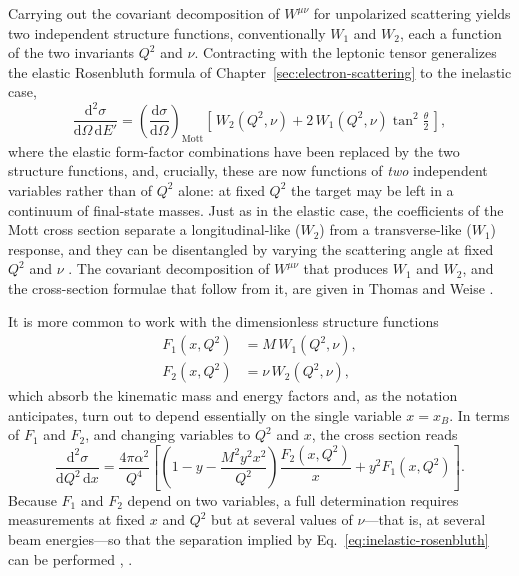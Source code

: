 Carrying out the covariant decomposition of $W^{\mu\nu}$ for unpolarized scattering
yields two independent structure functions, conventionally $W_{1}$ and $W_{2}$, each a
function of the two invariants $Q^{2}$ and $\nu$. Contracting with the leptonic tensor
generalizes the elastic Rosenbluth formula of Chapter~\ref{sec:electron-scattering} to
the inelastic case,
\begin{equation}
    \frac{\mathrm{d}^{2}\sigma}{\mathrm{d}\Omega\,\mathrm{d}E'}
    = \left(\frac{\mathrm{d}\sigma}{\mathrm{d}\Omega}\right)_{\!\mathrm{Mott}}
      \left[\,W_{2}(Q^{2},\nu) + 2\,W_{1}(Q^{2},\nu)\tan^{2}\tfrac{\theta}{2}\,\right],
    \label{eq:inelastic-rosenbluth}
\end{equation}
where the elastic form-factor combinations have been replaced by the two structure
functions, and, crucially, these are now functions of \emph{two} independent variables
rather than of $Q^{2}$ alone: at fixed $Q^{2}$ the target may be left in a continuum of
final-state masses. Just as in the elastic case, the coefficients of the Mott cross
section separate a longitudinal-like ($W_{2}$) from a transverse-like ($W_{1}$) response,
and they can be disentangled by varying the scattering angle at fixed $Q^{2}$ and $\nu$
\cite[Ch.~1]{Amsler2018}. The covariant decomposition of $W^{\mu\nu}$ that produces
$W_{1}$ and $W_{2}$, and the cross-section formulae that follow from it, are given in
Thomas and Weise \cite[Ch.~4]{ThomasWeise2001}.

It is more common to work with the dimensionless structure functions
\begin{align}
    F_{1}(x,Q^{2}) &= M\,W_{1}(Q^{2},\nu),
    \label{eq:F1-def}\\
    F_{2}(x,Q^{2}) &= \nu\,W_{2}(Q^{2},\nu),
    \label{eq:F2-def}
\end{align}
which absorb the kinematic mass and energy factors and, as the notation anticipates,
turn out to depend essentially on the single variable $x=x_{B}$. In terms of $F_{1}$ and
$F_{2}$, and changing variables to $Q^{2}$ and $x$, the cross section reads
\begin{equation}
    \frac{\mathrm{d}^{2}\sigma}{\mathrm{d}Q^{2}\,\mathrm{d}x}
    = \frac{4\pi\alpha^{2}}{Q^{4}}
      \left[\left(1 - y - \frac{M^{2}y^{2}x^{2}}{Q^{2}}\right)
      \frac{F_{2}(x,Q^{2})}{x} + y^{2}F_{1}(x,Q^{2})\right].
    \label{eq:dis-xsec}
\end{equation}
Because $F_{1}$ and $F_{2}$ depend on two variables, a full determination requires
measurements at fixed $x$ and $Q^{2}$ but at several values of $\nu$---that is, at
several beam energies---so that the separation implied by
Eq.~\eqref{eq:inelastic-rosenbluth}
can be performed \cite[Ch.~1]{Amsler2018}, \cite[Ch.~4]{ThomasWeise2001}.

